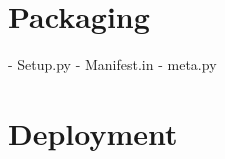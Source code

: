 

\section{Packaging}

- Setup.py
- Manifest.in
- meta.py



\section{Deployment}
\label{swidgenerator:architektur:deployment}

